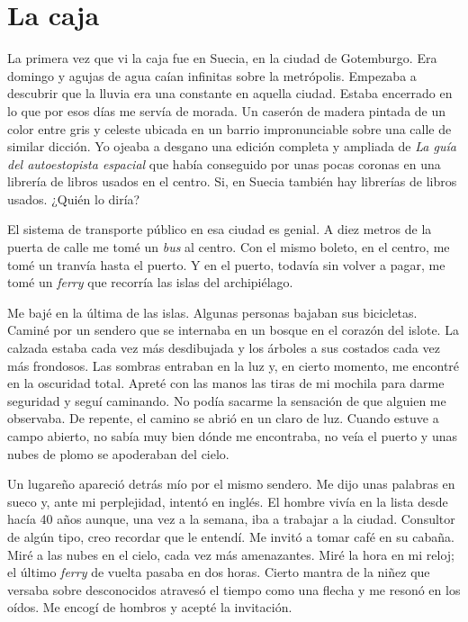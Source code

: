 \documentclass[11pt,twoside,openright,a6paper]{book}
\begin{document}
\chapter*{La caja}

La primera vez que vi la caja fue en Suecia, en la ciudad de Gotemburgo. Era domingo y agujas de agua caían infinitas sobre la metrópolis. Empezaba a descubrir que la lluvia era una constante en aquella ciudad. Estaba encerrado en lo que por esos días me servía de morada. Un caserón de madera pintada de un color entre gris y celeste ubicada en un barrio impronunciable sobre una calle de similar dicción. Yo ojeaba a desgano una edición completa y ampliada de \emph{La guía del autoestopista espacial} que había conseguido por unas pocas coronas en una librería de libros usados en el centro. Si, en Suecia también hay librerías de libros usados. ¿Quién lo diría?

El sistema de transporte público en esa ciudad es genial.  A diez metros de la puerta de calle me tomé un \emph{bus} al centro. Con el mismo boleto, en el centro, me tomé un tranvía hasta el puerto. Y en el puerto, todavía sin volver a pagar, me tomé un \emph{ferry} que recorría las islas del archipiélago.

Me bajé en la última de las islas. Algunas personas bajaban sus bicicletas. Caminé por un sendero que se internaba en un bosque en el corazón del islote. La calzada estaba cada vez más desdibujada y los árboles a sus costados cada vez más frondosos. Las sombras entraban en la luz y, en cierto momento, me encontré en la oscuridad total. Apreté con las manos las tiras de mi mochila para darme seguridad y seguí caminando. No podía sacarme la sensación de que alguien me observaba. De repente, el camino se abrió en un claro de luz. Cuando estuve a campo abierto, no sabía muy bien dónde me encontraba, no veía el puerto y unas nubes de plomo se apoderaban del cielo.

Un lugareño apareció detrás mío por el mismo sendero. Me dijo unas palabras en sueco y, ante mi perplejidad, intentó en inglés. El hombre vivía en la lista desde hacía 40 años aunque, una vez a la semana, iba a trabajar a la ciudad. Consultor de algún tipo, creo recordar que le entendí. Me invitó a tomar café en su cabaña. Miré a las nubes en el cielo, cada vez más amenazantes. Miré la hora en mi reloj; el último \emph{ferry} de vuelta pasaba en dos horas. Cierto mantra de la niñez que versaba sobre desconocidos atravesó el tiempo como una flecha y me resonó en los oídos. Me encogí de hombros y acepté la invitación.
\end{document}

